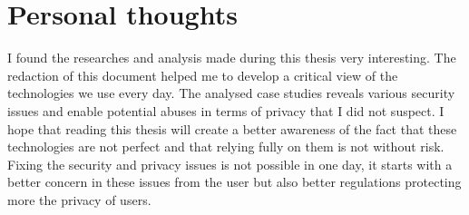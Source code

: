 \section{Personal thoughts}

I found the researches and analysis made during this thesis very interesting.
The redaction of this document helped me to develop a critical view of the technologies we use every day.
The analysed case studies reveals various security issues and enable potential abuses in terms of privacy that I did not suspect.
I hope that reading this thesis will create a better awareness of the fact that these technologies are not perfect and that relying fully on them is not without risk.
Fixing the security and privacy issues is not possible in one day, it starts with a better concern in these issues from the user but also better regulations protecting more the privacy of users.